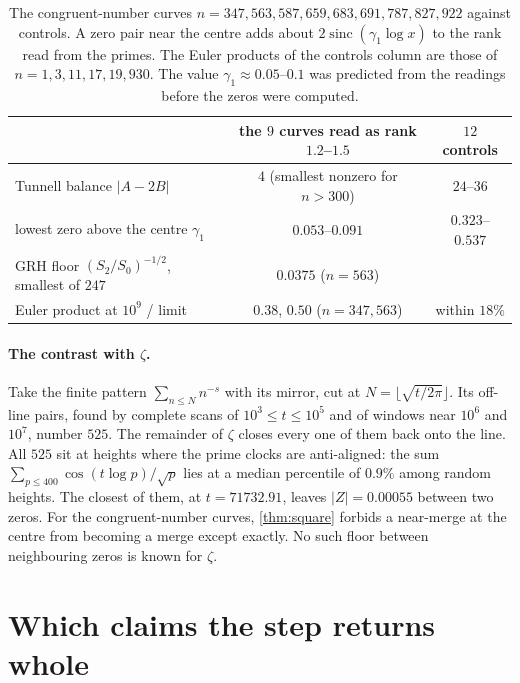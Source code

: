 \documentclass[11pt]{article}
\theoremstyle{definition}\newtheorem{definition}[theorem]{Definition}
\theoremstyle{remark}\newtheorem{remark}[theorem]{Remark}
\begin{document}
\begin{table}[t]\centering\small
\begin{tabular}{@{}lcc@{}}\toprule
 & the $9$ curves read as rank $1.2$--$1.5$ & $12$ controls\\\midrule
Tunnell balance $|A-2B|$ & $4$ (smallest nonzero for $n>300$) & $24$--$36$\\
lowest zero above the centre $\gamma_1$ & $0.053$--$0.091$ & $0.323$--$0.537$\\
GRH floor $(S_2/S_0)^{-1/2}$, smallest of $247$ & $0.0375$ ($n=563$) & \\
Euler product at $10^9$ / limit & $0.38$, $0.50$ ($n=347,563$) & within $18\%$\\\bottomrule
\end{tabular}
\caption{The congruent-number curves $n=347,563,587,659,683,691,787,827,922$ against controls. A zero pair near the centre adds about $2\operatorname{sinc}(\gamma_1\log x)$ to the rank read from the primes. The Euler products of the controls column are those of $n=1,3,11,17,19,930$. The value $\gamma_1\approx0.05$--$0.1$ was predicted from the readings before the zeros were computed.}
\label{tab:centre}
\end{table}

\paragraph{The contrast with $\zeta$.} Take the finite pattern $\sum_{n\le N}n^{-s}$ with its mirror, cut at $N=\lfloor\sqrt{t/2\pi}\rfloor$. Its off-line pairs, found by complete scans of $10^3\le t\le10^5$ and of windows near $10^6$ and $10^7$, number $525$. The remainder of $\zeta$ closes every one of them back onto the line. All $525$ sit at heights where the prime clocks are anti-aligned: the sum $\sum_{p\le400}\cos(t\log p)/\sqrt p$ lies at a median percentile of $0.9\%$ among random heights. The closest of them, at $t=71732.91$, leaves $|Z|=0.00055$ between two zeros. For the congruent-number curves, \cref{thm:square} forbids a near-merge at the centre from becoming a merge except exactly. No such floor between neighbouring zeros is known for $\zeta$.

\section{Which claims the step returns whole}\label{sec:whole}
\end{document}
